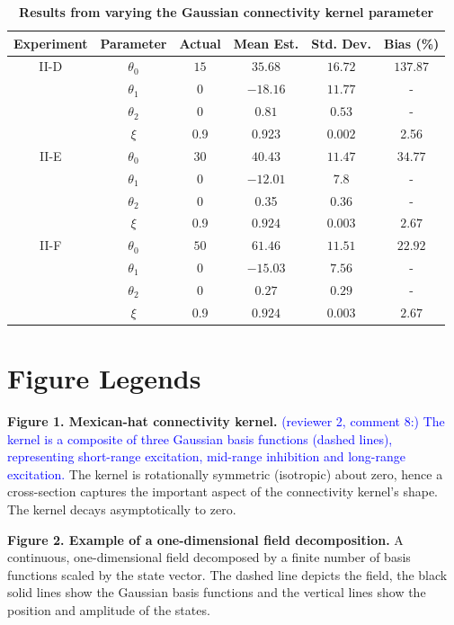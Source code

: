 \documentclass[review,authoryear,3p]{elsarticle}
\newcommand{\parham}[1]{\textcolor{blue}{#1}}
\begin{document}
\clearpage
\newpage
\begin{table}[!ht]
\begin{tabular}{c|ccccc}
	Experiment & Parameter & Actual & Mean Est. & Std. Dev. & Bias (\%) \\ \hline
	II-D &$\theta_0$ & $15$ & $35.68$ & $16.72$ & $137.87$ \\
	& $\theta_1$ & 0 & $-18.16$ & $11.77$ & - \\
	& $\theta_2$ & 0 & $0.81$ & $0.53$ & - \\
	& $\xi$ & 0.9 & 0.923 & $0.002$ & 2.56 \\ \hline	
	
 	II-E& $\theta_0$ & $30$ & $40.43$ & $11.47$ & $34.77$ \\
	& $\theta_1$ & 0 & $-12.01$ & $7.8$ & - \\
	& $\theta_2$ & 0 & 0.35 & $0.36$ & - \\
	& $\xi$ & 0.9 & $0.924$ & $0.003$ & $2.67$ \\ \hline
	
	II-F & $\theta_0$ & $50$ & $61.46$ & $11.51$ & $22.92$ \\
	& $\theta_1$ & 0 & $-15.03$ & $7.56$ & - \\
	& $\theta_2$ & 0 & $0.27$ & $0.29$ & - \\
	& $\xi$ & 0.9 & $0.924$ & $0.003$ & $2.67$ \\ \hline
\end{tabular}
\caption{\textbf{Results from varying the Gaussian connectivity kernel parameter}}
\label{tab:GaussianKernelResults}
\end{table}

\doublespacing

\newpage
\clearpage
\section*{Figure Legends}
{\bf Figure 1. Mexican-hat connectivity kernel.} \parham{(reviewer 2, comment 8:) The kernel is a composite of three Gaussian basis functions (dashed lines), representing short-range excitation, mid-range inhibition and long-range excitation.} The kernel is rotationally symmetric (isotropic) about zero, hence a cross-section captures the important aspect of the connectivity kernel's shape. The kernel decays asymptotically to zero.

{\bf Figure 2. Example of a one-dimensional field decomposition.} A continuous, one-dimensional field decomposed by a finite number of basis functions scaled by the state vector. The dashed line depicts the field, the black solid lines show the Gaussian basis functions and the vertical lines show the position and amplitude of the states.
\end{document}
